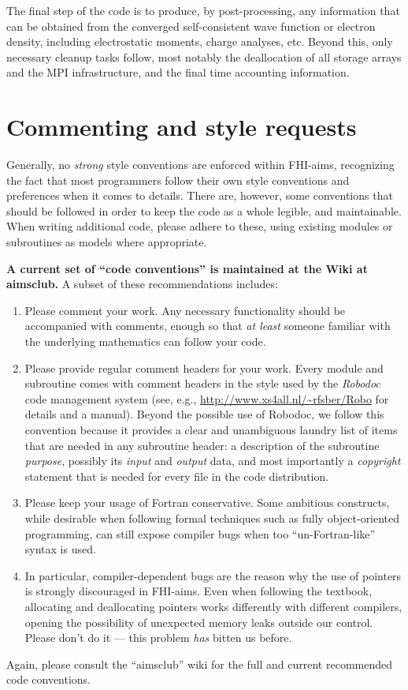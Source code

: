 The final step of the code is to produce, by post-processing, any
information that can be obtained from the converged self-consistent
wave function or electron density, including electrostatic moments,
charge analyses, etc. Beyond this, only necessary cleanup tasks
follow, most notably the deallocation of all storage arrays and the
MPI infrastructure, and the final time accounting information. 

\section{Commenting and style requests}

Generally, no \emph{strong} style conventions are enforced within
FHI-aims, recognizing the fact that most programmers follow their own
style conventions and preferences when it comes to details. There are,
however, some conventions that should be followed in order to keep the
code as a whole legible, and maintainable. When writing additional
code, please adhere to these, using existing modules or subroutines as
models where appropriate.

\textbf{A current set of ``code conventions'' is maintained at the Wiki
  at aimsclub.} A subset of these recommendations includes:
\begin{enumerate}
  \item Please comment your work. Any necessary functionality should
    be accompanied with comments, enough so that \emph{at least}
    someone familiar with the underlying mathematics can follow your
    code. 
  \item Please provide regular comment headers for your work. Every
    module and subroutine comes with comment headers in the style used
    by the \emph{Robodoc} code management system (see, e.g.,
    \url{http://www.xs4all.nl/~rfsber/Robo} for details and a
    manual). Beyond the possible use of Robodoc, we follow this
    convention because it provides a clear and unambiguous laundry
    list of items that are needed in any subroutine header: a
    description of the subroutine \emph{purpose}, possibly its
    \emph{input} and \emph{output} data, and most importantly a
    \emph{copyright} statement that is needed for every file in the
    code distribution. 
  \item Please keep your usage of Fortran conservative. Some ambitious
    constructs, while desirable when following formal techniques such
    as fully object-oriented programming, can still expose
    compiler bugs when too ``un-Fortran-like'' syntax is used. 
  \item In particular, compiler-dependent bugs are the reason why the
    use of pointers is strongly discouraged in FHI-aims. Even when
    following the textbook, allocating and deallocating pointers works
    differently with different compilers, opening the possibility of
    unexpected memory leaks outside our control. Please don't do it ---
    this problem \emph{has} bitten us before.
\end{enumerate}
Again, please consult the ``aimsclub'' wiki for the full and current
recommended code conventions.
